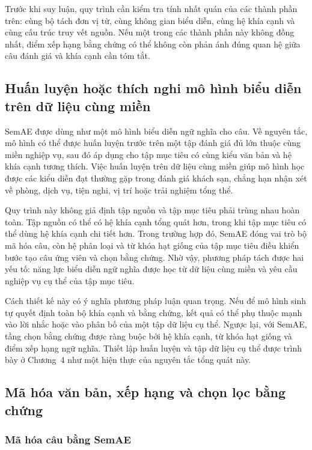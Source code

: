Trước khi suy luận, quy trình cần kiểm tra tính nhất quán của các thành phần trên: cùng bộ tách đơn vị từ, cùng không gian biểu diễn, cùng hệ khía cạnh và cùng cấu trúc truy vết nguồn. Nếu một trong các thành phần này không đồng nhất, điểm xếp hạng bằng chứng có thể không còn phản ánh đúng quan hệ giữa câu đánh giá và khía cạnh cần tóm tắt.


\subsection{Huấn luyện hoặc thích nghi mô hình biểu diễn trên dữ liệu cùng miền}
\label{subsec:method2-domain-training-transfer}

SemAE được dùng như một mô hình biểu diễn ngữ nghĩa cho câu. Về nguyên tắc, mô hình có thể được huấn luyện trước trên một tập đánh giá đủ lớn thuộc cùng miền nghiệp vụ, sau đó áp dụng cho tập mục tiêu có cùng kiểu văn bản và hệ khía cạnh tương thích. Việc huấn luyện trên dữ liệu cùng miền giúp mô hình học được các kiểu diễn đạt thường gặp trong đánh giá khách sạn, chẳng hạn nhận xét về phòng, dịch vụ, tiện nghi, vị trí hoặc trải nghiệm tổng thể.

Quy trình này không giả định tập nguồn và tập mục tiêu phải trùng nhau hoàn toàn. Tập nguồn có thể có hệ khía cạnh tổng quát hơn, trong khi tập mục tiêu có thể dùng hệ khía cạnh chi tiết hơn. Trong trường hợp đó, SemAE đóng vai trò bộ mã hóa câu, còn hệ phân loại và từ khóa hạt giống của tập mục tiêu điều khiển bước tạo câu ứng viên và chọn bằng chứng. Nhờ vậy, phương pháp tách được hai yếu tố: năng lực biểu diễn ngữ nghĩa được học từ dữ liệu cùng miền và yêu cầu nghiệp vụ cụ thể của tập mục tiêu.

Cách thiết kế này có ý nghĩa phương pháp luận quan trọng. Nếu để mô hình sinh tự quyết định toàn bộ khía cạnh và bằng chứng, kết quả có thể phụ thuộc mạnh vào lời nhắc hoặc vào phân bố của một tập dữ liệu cụ thể. Ngược lại, với SemAE, tầng chọn bằng chứng được ràng buộc bởi hệ khía cạnh, từ khóa hạt giống và điểm xếp hạng ngữ nghĩa. Thiết lập huấn luyện và tập dữ liệu cụ thể được trình bày ở Chương~4 như một hiện thực của nguyên tắc tổng quát này.

\subsection{Mã hóa văn bản, xếp hạng và chọn lọc bằng chứng}
\label{subsec:method2-encoding-ranking}

\subsubsection{Mã hóa câu bằng SemAE}
\label{subsubsec:method2-semae-encoding}

